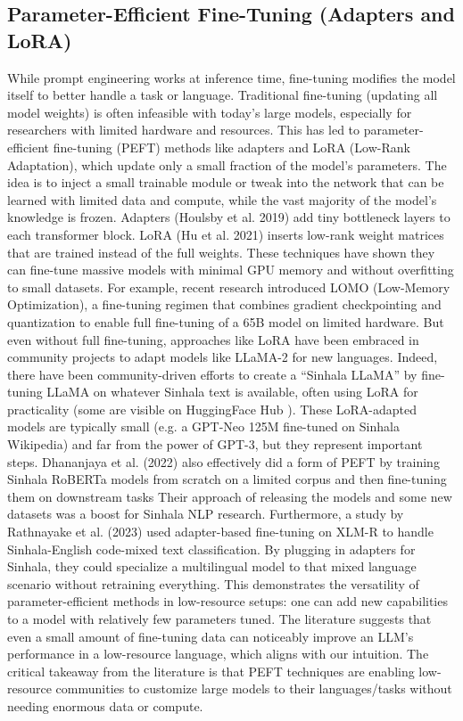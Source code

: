 \documentclass[12pt]{uomthesis}
\begin{document}
\subsection{Parameter-Efficient Fine-Tuning (Adapters and LoRA)}
While prompt engineering works at inference time, fine-tuning modifies the model itself to better handle a task or language. Traditional fine-tuning (updating all model weights) is often infeasible with today’s large models, especially for researchers with limited hardware and resources. This has led to parameter-efficient fine-tuning (PEFT) methods like adapters and LoRA (Low-Rank Adaptation), which update only a small fraction of the model’s parameters. The idea is to inject a small trainable module or tweak into the network that can be learned with limited data and compute, while the vast majority of the model’s knowledge is frozen. Adapters (Houlsby et al. 2019) \cite{25} add tiny bottleneck layers to each transformer block. LoRA (Hu et al. 2021) \cite{26} inserts low-rank weight matrices that are trained instead of the full weights. These techniques have shown they can fine-tune massive models with minimal GPU memory and without overfitting to small datasets. For example, recent research introduced LOMO (Low-Memory Optimization), a fine-tuning regimen that combines gradient checkpointing and quantization to enable full fine-tuning of a 65B model on limited hardware. But even without full fine-tuning, approaches like LoRA have been embraced in community projects to adapt models like LLaMA-2 for new languages. Indeed, there have been community-driven efforts to create a “Sinhala LLaMA” by fine-tuning LLaMA on whatever Sinhala text is available, often using LoRA for practicality (some are visible on HuggingFace Hub \cite{10}). These LoRA-adapted models are typically small (e.g. a GPT-Neo 125M fine-tuned on Sinhala Wikipedia) and far from the power of GPT-3, but they represent important steps. Dhananjaya et al. (2022) \cite{2} also effectively did a form of PEFT by training Sinhala RoBERTa models from scratch on a limited corpus and then fine-tuning them on downstream tasks Their approach of releasing the models and some new datasets was a boost for Sinhala NLP research. Furthermore, a study by Rathnayake et al. (2023) \cite{27} used adapter-based fine-tuning on XLM-R to handle Sinhala-English code-mixed text classification. By plugging in adapters for Sinhala, they could specialize a multilingual model to that mixed language scenario without retraining everything. This demonstrates the versatility of parameter-efficient methods in low-resource setups: one can add new capabilities to a model with relatively few parameters tuned.
The literature suggests that even a small amount of fine-tuning data can noticeably improve an LLM’s performance in a low-resource language, which aligns with our intuition. The critical takeaway from the literature is that PEFT techniques are enabling low-resource communities to customize large models to their languages/tasks without needing enormous data or compute.
\end{document}

